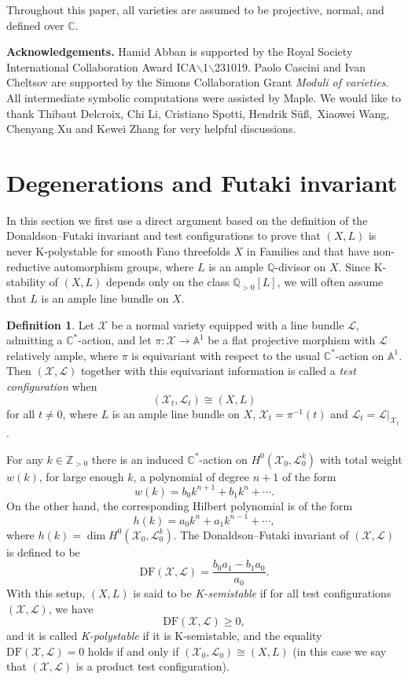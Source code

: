 \documentclass[12pt]{amsart}
\theoremstyle{definition}
\newtheorem{definition}[theorem]{Definition}
\theoremstyle{remark}
\begin{document}
Throughout this paper, all varieties are assumed to be projective, normal, and defined over $\mathbb{C}$.

\medskip
\noindent
\textbf{Acknowledgements.}
Hamid Abban is supported by the Royal Society International Collaboration Award ICA$\backslash$1$\backslash$231019.
Paolo Cascini and Ivan Cheltsov are supported by the Simons Collaboration Grant \textit{Moduli of varieties}.
All intermediate symbolic computations were assisted by Maple. We would like to thank Thibaut Delcroix, Chi Li, Cristiano Spotti, Hendrik S\"u\ss,\ Xiaowei Wang, Chenyang Xu and Kewei Zhang for very helpful discussions. 


\section{Degenerations and Futaki invariant}
\label{section:degeneration}
In this section we first use a direct argument based on the definition of the Donaldson--Futaki invariant and test configurations
to prove that $(X,L)$ is never K-polystable for smooth Fano threefolds $X$ in Families  and  that have non-reductive automorphism groups,
where $L$ is an ample $\mathbb{Q}$-divisor on $X$. Since K-stability of $(X,L)$ depends only on the class $\mathbb{Q}_{>0}[L]$, we will often assume that $L$ is an ample line bundle on $X$.

\begin{definition}
\label{test-configuration}
Let $\mathcal{X}$ be a normal variety equipped with a line
bundle $\mathcal{L}$, admitting a $\mathbb{C}^*$-action, and let $\pi\colon\mathcal{X}\to\mathbb{A}^1$ be a flat projective morphism
with $\mathcal{L}$ relatively ample, where $\pi$ is equivariant with  respect to the usual $\mathbb{C}^*$-action on $\mathbb{A}^1$.
Then $\mathcal{(X,L)}$ together with this equivariant information is called a {\it test configuration} when
$$
(\mathcal{X}_t,\mathcal{L}_t)\cong (X,L)
$$
for all  $t\neq 0$, where $L$ is an ample line bundle on $X$,  $\mathcal{X}_t=\pi^{-1}(t)$ and $\mathcal{L}_t=\mathcal{L}\vert_{\mathcal{X}_{t}}$.

For any $k\in\mathbb{Z}_{>0}$ there is an induced $\mathbb{C}^*$-action on $H^0(\mathcal{X}_0,\mathcal{L}^k_0)$ with total weight $w(k)$, for large enough $k$, a
polynomial of degree $n+1$ of the form
$$
w(k)=b_0k^{n+1}+b_1k^n+\cdots.
$$
On the other hand, the corresponding Hilbert polynomial is of the form
$$
h(k)= a_0k^n + a_1k^{n-1} +\cdots,
$$
where $h(k)=\dim H^0(\mathcal{X}_0,\mathcal{L}^k_0)$. The Donaldson--Futaki invariant of $\mathcal{(X,L)}$ is defined to be
$$
\mathrm{DF}\mathcal{(X,L)} = \frac{b_0a_1-b_1a_0}{a_0}.
$$
With this setup, $(X,L)$ is said to be {\it K-semistable} if for all test configurations $\mathcal{(X,L)}$, we have
$$
\mathrm{DF}\mathcal{(X,L)}\geqslant 0,
$$
and it is called {\it K-polystable} if it is K-semistable, and the equality $\mathrm{DF}\mathcal{(X,L)}=0$ holds
if and only if $(\mathcal{X}_0,\mathcal{L}_0)\cong (X,L)$ (in this case we say that $\mathcal{(X,L)}$ is a product test configuration).
\end{definition}
\end{document}
